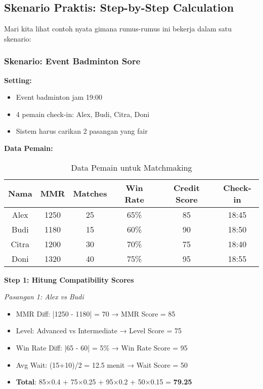 \documentclass[12pt]{article}
\begin{document}
\subsection{Skenario Praktis: Step-by-Step Calculation}

Mari kita lihat contoh nyata gimana rumus-rumus ini bekerja dalam satu skenario:

\subsubsection{Skenario: Event Badminton Sore}

\textbf{Setting:}
\begin{itemize}
    \item Event badminton jam 19:00
    \item 4 pemain check-in: Alex, Budi, Citra, Doni
    \item Sistem harus carikan 2 pasangan yang fair
\end{itemize}

\textbf{Data Pemain:}
\begin{table}[H]
\centering
\begin{tabular}{|c|c|c|c|c|c|}
\hline
\textbf{Nama} & \textbf{MMR} & \textbf{Matches} & \textbf{Win Rate} & \textbf{Credit Score} & \textbf{Check-in} \\
\hline
Alex & 1250 & 25 & 65\% & 85 & 18:45 \\
Budi & 1180 & 15 & 60\% & 90 & 18:50 \\
Citra & 1200 & 30 & 70\% & 75 & 18:40 \\
Doni & 1320 & 40 & 75\% & 95 & 18:55 \\
\hline
\end{tabular}
\caption{Data Pemain untuk Matchmaking}
\end{table}

\textbf{Step 1: Hitung Compatibility Scores}

\textit{Pasangan 1: Alex vs Budi}
\begin{itemize}
    \item MMR Diff: |1250 - 1180| = 70 → MMR Score = 85
    \item Level: Advanced vs Intermediate → Level Score = 75
    \item Win Rate Diff: |65 - 60| = 5\% → Win Rate Score = 95
    \item Avg Wait: (15+10)/2 = 12.5 menit → Wait Score = 50
    \item \textbf{Total}: 85×0.4 + 75×0.25 + 95×0.2 + 50×0.15 = \textbf{79.25}
\end{itemize}
\end{document}
